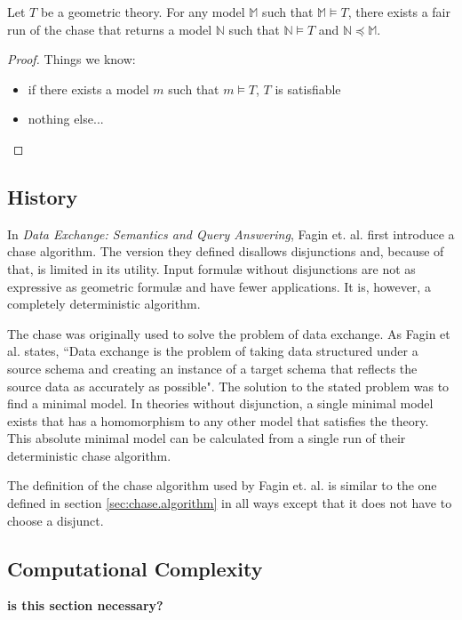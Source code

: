 		\begin{theorem}
			Let $T$ be a geometric theory. For any model $\mathbb{M}$ such that
			$\mathbb{M} \models T$, there exists a fair run of the chase that
			returns a model $\mathbb{N}$ such that $\mathbb{N} \models T$ and
			$\mathbb{N} \preceq \mathbb{M}$.
		\end{theorem}

		\begin{proof}
			Things we know:
			\begin{itemize}
			\item if there exists a model $m$ such that $m \models T$, $T$ is satisfiable
			\item nothing else...
			\end{itemize}
		\end{proof}

	\subsection{History}

		In \cite{FKMP02} \emph{Data Exchange: Semantics and Query Answering},
		Fagin et. al. first introduce a chase algorithm. The version they
		defined disallows disjunctions and, because of that, is limited in its
		utility. Input formul{\ae} without disjunctions are not as expressive
		as geometric formul{\ae} and have fewer applications. It is, however, a
		completely deterministic algorithm.

		The chase was originally used to solve the problem of data exchange. As
		Fagin et al. states, ``Data exchange is the problem of taking data
		structured under a source schema and creating an instance of a target
		schema that reflects the source data as accurately as possible". The
		solution to the stated problem was to find a minimal model. In theories
		without disjunction, a single minimal model exists that has a
		homomorphism to any other model that satisfies the theory. This
		absolute minimal model can be calculated from a single run of their
		deterministic chase algorithm.

		The definition of the chase algorithm used by Fagin et. al. is similar
		to the one defined in section \ref{sec:chase.algorithm} in all ways
		except that it does not have to choose a disjunct.

	\subsection{Computational Complexity}

		\textbf{ is this section necessary? }
